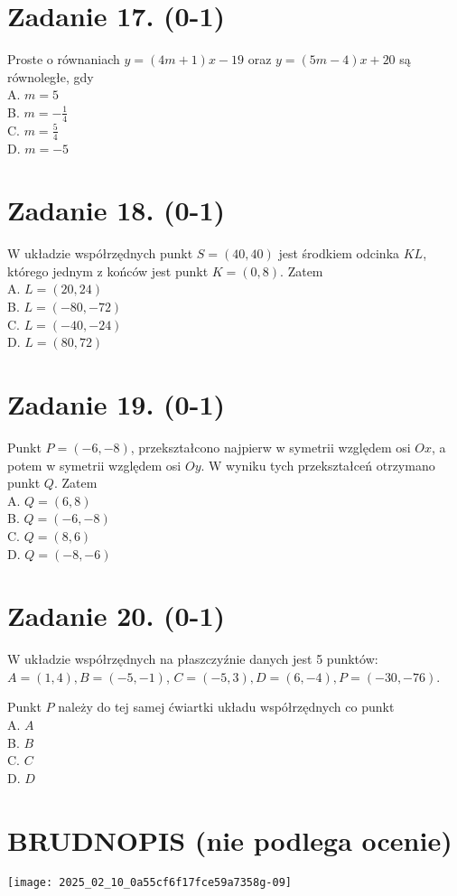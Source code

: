 \documentclass[10pt]{article}
\begin{document}
\section*{Zadanie 17. (0-1)}
Proste o równaniach \(y=(4 m+1) x-19\) oraz \(y=(5 m-4) x+20\) są równoległe, gdy\\
A. \(m=5\)\\
B. \(m=-\frac{1}{4}\)\\
C. \(m=\frac{5}{4}\)\\
D. \(m=-5\)

\section*{Zadanie 18. (0-1)}
W układzie współrzędnych punkt \(S=(40,40)\) jest środkiem odcinka \(K L\), którego jednym z końców jest punkt \(K=(0,8)\). Zatem\\
A. \(L=(20,24)\)\\
B. \(L=(-80,-72)\)\\
C. \(L=(-40,-24)\)\\
D. \(L=(80,72)\)

\section*{Zadanie 19. (0-1)}
Punkt \(P=(-6,-8)\), przekształcono najpierw w symetrii względem osi \(O x\), a potem w symetrii względem osi \(O y\). W wyniku tych przekształceń otrzymano punkt \(Q\). Zatem\\
A. \(Q=(6,8)\)\\
B. \(Q=(-6,-8)\)\\
C. \(Q=(8,6)\)\\
D. \(Q=(-8,-6)\)

\section*{Zadanie 20. (0-1)}
W układzie współrzędnych na płaszczyźnie danych jest 5 punktów: \(A=(1,4), B=(-5,-1)\), \(C=(-5,3), D=(6,-4), P=(-30,-76)\).

Punkt \(P\) należy do tej samej ćwiartki układu współrzędnych co punkt\\
A. \(A\)\\
B. \(B\)\\
C. \(C\)\\
D. \(D\)

\section*{BRUDNOPIS (nie podlega ocenie)}
\begin{center}
\texttt{[image: 2025\_02\_10\_0a55cf6f17fce59a7358g-09]}
\end{center}
\end{document}
